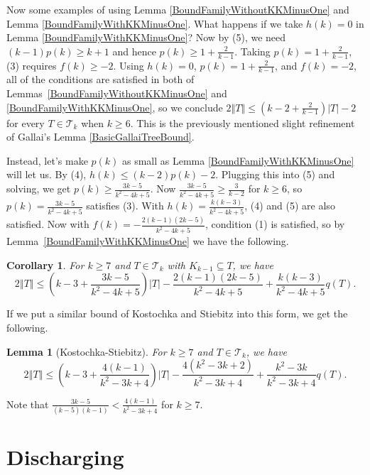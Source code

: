\documentclass[12pt]{article}
\theoremstyle{plain}
\newtheorem{lem}[thm]{Lemma}
\newtheorem{cor}[thm]{Corollary}
\theoremstyle{definition}
\theoremstyle{remark}
\newcommand{\fancy}[1]{\mathcal{#1}}
\newcommand{\T}{\fancy{T}}
\newcommand{\card}[1]{\left|#1\right|}
\newcommand{\size}[1]{\left\Vert#1\right\Vert}
\newcommand{\parens}[1]{\left( #1 \right)}
\begin{document}
Now some examples of using Lemma \ref{BoundFamilyWithoutKKMinusOne} and Lemma \ref{BoundFamilyWithKKMinusOne}.  What happens if we take $h(k) = 0$ in Lemma \ref{BoundFamilyWithKKMinusOne}?  Now by (5), we need $(k-1)p(k) \ge k + 1$ and hence $p(k) \ge 1 + \frac{2}{k-1}$.  Taking $p(k) = 1 + \frac{2}{k-1}$, (3) requires $f(k) \ge -2$.  Using $h(k)=0$, $p(k)=1+\frac2{k-1}$, and $f(k) = -2$, all of the conditions are satisfied in both of Lemmas~\ref{BoundFamilyWithoutKKMinusOne} and \ref{BoundFamilyWithKKMinusOne}, so we conclude $2\size{T} \le \parens{k-2 + \frac{2}{k-1}}\card{T} - 2$ for every $T \in \T_k$ when $k \ge 6$.  This is the previously mentioned slight refinement of Gallai's Lemma \ref{BasicGallaiTreeBound}.

Instead, let's make $p(k)$ as small as Lemma \ref{BoundFamilyWithKKMinusOne} will let us. By (4), $h(k) \le (k-2)p(k) - 2$. Plugging this into (5) and solving, we get $p(k) \ge \frac{3k-5}{k^2 - 4k + 5}$.  Now $\frac{3k-5}{k^2 - 4k + 5} \ge \frac{3}{k-2}$ for $k \ge 6$, so $p(k) = \frac{3k-5}{k^2 - 4k + 5}$ satisfies (3).  With $h(k) = \frac{k(k-3)}{k^2 - 4k + 5}$, (4) and (5) are also satisfied. Now with $f(k) = -\frac{2(k-1)(2k-5)}{k^2 - 4k + 5}$, condition (1) is satisfied, so by Lemma~\ref{BoundFamilyWithKKMinusOne} we have the following.

\begin{cor}\label{SmallP}
	For $k \ge 7$ and $T \in \T_k$ with $K_{k-1} \subseteq T$, we have
	\[2\size{T} \le \parens{k-3 + \frac{3k-5}{k^2 - 4k + 5}}\card{T} - \frac{2(k-1)(2k-5)}{k^2 - 4k + 5} + \frac{k(k-3)}{k^2 - 4k + 5}q(T).\]
\end{cor}

If we put a similar bound of Kostochka and Stiebitz into this form, we get the following.

\begin{lem}[Kostochka-Stiebitz]
		For $k \ge 7$ and $T \in \T_k$, we have
		\[2\size{T} \le \parens{k-3 + \frac{4(k-1)}{k^2 - 3k + 4}}\card{T} - \frac{4(k^2-3k+2)}{k^2-3k+4} + \frac{k^2 - 3k}{k^2-3k+4}q(T).\]
\end{lem}

Note that $\frac{3k-5}{(k-5)(k-1)} < \frac{4(k-1)}{k^2 - 3k + 4}$ for $k \ge 7$.

\section{Discharging}\label{discharging}
\end{document}
